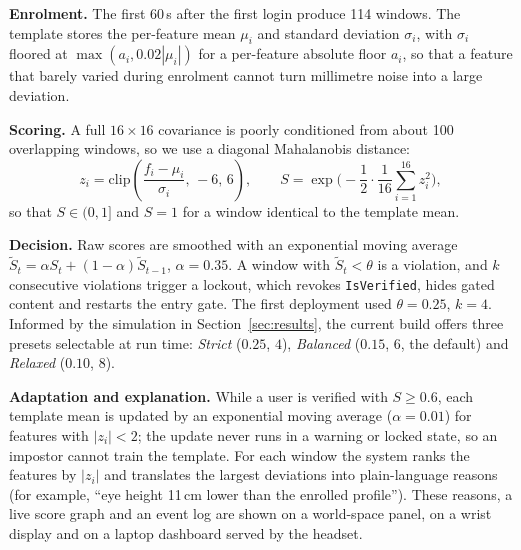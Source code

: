 \textbf{Enrolment.} The first 60\,s after the first login produce 114 windows. The template stores the per-feature mean $\mu_i$ and standard deviation $\sigma_i$, with $\sigma_i$ floored at $\max(a_i, 0.02|\mu_i|)$ for a per-feature absolute floor $a_i$, so that a feature that barely varied during enrolment cannot turn millimetre noise into a large deviation.

\textbf{Scoring.} A full $16{\times}16$ covariance is poorly conditioned from about 100 overlapping windows, so we use a diagonal Mahalanobis distance:
\begin{equation}
z_i=\mathrm{clip}\!\left(\frac{f_i-\mu_i}{\sigma_i},\,-6,\,6\right),\qquad S=\exp\!\Big(-\frac{1}{2}\cdot\frac{1}{16}\sum_{i=1}^{16} z_i^2\Big),
\end{equation}
so that $S\in(0,1]$ and $S{=}1$ for a window identical to the template mean.

\textbf{Decision.} Raw scores are smoothed with an exponential moving average $\tilde S_t=\alpha S_t+(1-\alpha)\tilde S_{t-1}$, $\alpha{=}0.35$. A window with $\tilde S_t<\theta$ is a violation, and $k$ consecutive violations trigger a lockout, which revokes \texttt{IsVerified}, hides gated content and restarts the entry gate. The first deployment used $\theta{=}0.25$, $k{=}4$. Informed by the simulation in Section~\ref{sec:results}, the current build offers three presets selectable at run time: \emph{Strict} ($0.25$, $4$), \emph{Balanced} ($0.15$, $6$, the default) and \emph{Relaxed} ($0.10$, $8$).

\textbf{Adaptation and explanation.} While a user is verified with $S\geq0.6$, each template mean is updated by an exponential moving average ($\alpha{=}0.01$) for features with $|z_i|<2$; the update never runs in a warning or locked state, so an impostor cannot train the template. For each window the system ranks the features by $|z_i|$ and translates the largest deviations into plain-language reasons (for example, ``eye height 11\,cm lower than the enrolled profile''). These reasons, a live score graph and an event log are shown on a world-space panel, on a wrist display and on a laptop dashboard served by the headset.

